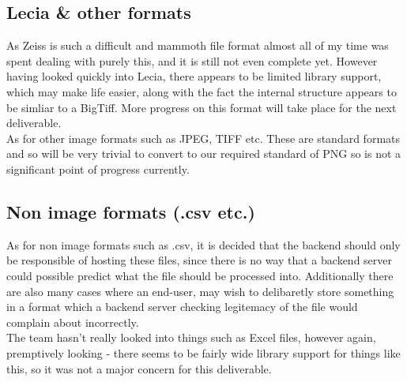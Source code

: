 \subsection{Lecia \& other formats}
As Zeiss is such a difficult and mammoth file format almost all of my time was spent dealing with purely this,
and it is still not even complete yet. However having looked quickly into Lecia, there appears to be limited
library support, which may make life easier, along with the fact the internal structure appears to be simliar to
a BigTiff. More progress on this format will take place for the next deliverable.\\
As for other image formats such as JPEG, TIFF etc. These are standard formats and so will be very trivial to
convert to our required standard of PNG so is not a significant point of progress currently.

\subsection{Non image formats (.csv etc.)}
As for non image formats such as .csv, it is decided that the backend should only be responsible of hosting these
files, since there is no way that a backend server could possible predict what the file should be processed into.
Additionally there are also many cases where an end-user, may wish to delibaretly store something in a format
which a backend server checking legitemacy of the file would complain about incorrectly.\\
The team hasn't really looked into things such as Excel files, however again, premptively looking - there seems to
be fairly wide library support for things like this, so it was not a major concern for this deliverable.
